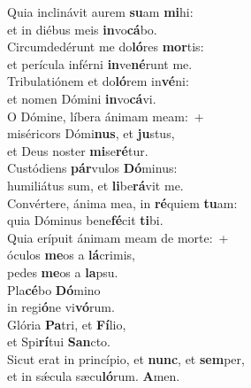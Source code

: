 \evenverse Quia inclinávit aurem \textbf{su}am \textbf{mi}hi:~\*\\
\evenverse et in diébus meis \textbf{in}vo\textbf{cá}bo.\\
\oddverse Circumdedérunt me do\textbf{ló}res \textbf{mor}tis:~\*\\
\oddverse et perícula inférni \textbf{in}ve\textbf{né}runt me.\\
\evenverse Tribulatiónem et do\textbf{ló}rem in\textbf{vé}ni:~\*\\
\evenverse et nomen Dómini \textbf{in}vo\textbf{cá}vi.\\
\oddverse O Dómine, líbera ánimam meam:~+\\
\oddverse  miséricors Dómi\textbf{nus}, et \textbf{ju}stus,~\*\\
\oddverse et Deus noster \textbf{mi}se\textbf{ré}tur.\\
\evenverse Custódiens \textbf{pár}vulos \textbf{Dó}minus:~\*\\
\evenverse humiliátus sum, et \textbf{li}be\textbf{rá}vit me.\\
\oddverse Convértere, ánima mea, in \textbf{ré}quiem \textbf{tu}am:~\*\\
\oddverse quia Dóminus bene\textbf{fé}cit \textbf{ti}bi.\\
\evenverse Quia erípuit ánimam meam de morte:~+\\
\evenverse  óculos \textbf{me}os a \textbf{lá}crimis,~\*\\
\evenverse pedes \textbf{me}os a \textbf{la}psu.\\
\oddverse Pla\textbf{cé}bo \textbf{Dó}mino~\*\\
\oddverse in regi\textbf{ó}ne vi\textbf{vó}rum.\\
\evenverse Glória \textbf{Pa}tri, et \textbf{Fí}lio,~\*\\
\evenverse et Spi\textbf{rí}tui \textbf{San}cto.\\
\oddverse Sicut erat in princípio, et \textbf{nunc}, et \textbf{sem}per,~\*\\
\oddverse et in sǽcula sæcu\textbf{ló}rum. \textbf{A}men.\\
